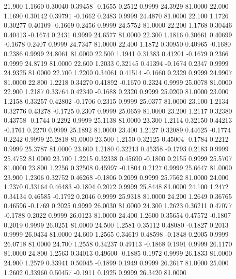   21.900   1.1660   0.30040   0.39458  -0.1655   0.2512   0.9999  24.3929  81.0000
  22.000   1.1690   0.30142   0.39791  -0.1662   0.2483   0.9999  24.4870  81.0000
  22.100   1.1726   0.30277   0.40109  -0.1669   0.2456   0.9999  24.5752  81.0000
  22.200   1.1768   0.30446   0.40413  -0.1674   0.2431   0.9999  24.6577  81.0000
  22.300   1.1816   0.30661   0.40699  -0.1678   0.2407   0.9999  24.7347  81.0000
  22.400   1.1872   0.30950   0.40965  -0.1680   0.2386   0.9999  24.8061  81.0000
  22.500   1.1941   0.31383   0.41201  -0.1679   0.2366   0.9999  24.8719  81.0000
  22.600   1.2033   0.32145   0.41394  -0.1674   0.2347   0.9999  24.9325  81.0000
  22.700   1.2200   0.34061   0.41514  -0.1660   0.2329   0.9999  24.9907  81.0000
  22.800   1.2218   0.34270   0.41892  -0.1670   0.2324   0.9999  25.0078  81.0000
  22.900   1.2187   0.33764   0.42340  -0.1688   0.2320   0.9999  25.0200  81.0000
  23.000   1.2158   0.33257   0.42802  -0.1706   0.2315   0.9999  25.0377  81.0000
  23.100   1.2134   0.32776   0.43278  -0.1725   0.2307   0.9999  25.0659  81.0000
  23.200   1.2117   0.32380   0.43758  -0.1744   0.2292   0.9999  25.1138  81.0000
  23.300   1.2114   0.32150   0.44213  -0.1761   0.2270   0.9999  25.1892  81.0000
  23.400   1.2127   0.32089   0.44625  -0.1774   0.2242   0.9999  25.2818  81.0000
  23.500   1.2150   0.32125   0.45004  -0.1784   0.2212   0.9999  25.3787  81.0000
  23.600   1.2180   0.32213   0.45358  -0.1793   0.2183   0.9999  25.4752  81.0000
  23.700   1.2215   0.32338   0.45690  -0.1800   0.2155   0.9999  25.5707  81.0000
  23.800   1.2256   0.32508   0.45997  -0.1804   0.2127   0.9999  25.6647  81.0000
  23.900   1.2306   0.32752   0.46268  -0.1806   0.2099   0.9999  25.7562  81.0000
  24.000   1.2370   0.33164   0.46483  -0.1804   0.2072   0.9999  25.8448  81.0000
  24.100   1.2472   0.34134   0.46585  -0.1792   0.2046   0.9999  25.9318  81.0000
  24.200   1.2649   0.36765   0.46596  -0.1769   0.2025   0.9999  26.0030  81.0000
  24.300   1.2623   0.36211   0.47077  -0.1788   0.2022   0.9999  26.0123  81.0000
  24.400   1.2600   0.35654   0.47572  -0.1807   0.2019   0.9999  26.0251  81.0000
  24.500   1.2581   0.35112   0.48080  -0.1827   0.2013   0.9999  26.0434  81.0000
  24.600   1.2565   0.34619   0.48598  -0.1848   0.2005   0.9999  26.0718  81.0000
  24.700   1.2558   0.34237   0.49113  -0.1868   0.1991   0.9999  26.1170  81.0000
  24.800   1.2563   0.34013   0.49600  -0.1885   0.1972   0.9999  26.1833  81.0000
  24.900   1.2579   0.33941   0.50045  -0.1899   0.1949   0.9999  26.2617  81.0000
  25.000   1.2602   0.33960   0.50457  -0.1911   0.1925   0.9999  26.3420  81.0000
